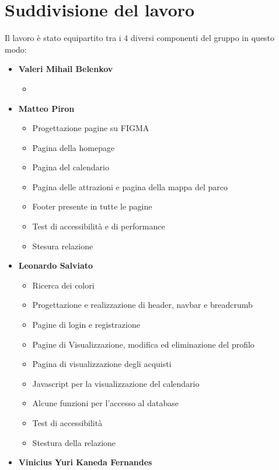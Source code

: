 \section{Suddivisione del lavoro}
Il lavoro è stato equipartito tra i 4 diversi componenti del gruppo in questo modo:

\begin{itemize}
    \item \textbf{Valeri Mihail Belenkov}
        \begin{itemize}
            \item 
        \end{itemize}
    \item \textbf{Matteo Piron}
        \begin{itemize}
            \item Progettazione pagine su FIGMA
            \item Pagina della homepage
            \item Pagina del calendario
            \item Pagina delle attrazioni e pagina della mappa del parco
            \item Footer presente in tutte le pagine
            \item Test di accessibilità e di performance
            \item Stesura relazione
        \end{itemize}
    \item \textbf{Leonardo Salviato}
        \begin{itemize}
            \item Ricerca dei colori
            \item Progettazione e realizzazione di header, navbar e breadcrumb
            \item Pagine di login e registrazione
            \item Pagine di Visualizzazione, modifica ed eliminazione del profilo
            \item Pagina di visualizzazione degli acquisti
            \item Javascript per la visualizzazione del calendario
            \item Alcune funzioni per l'accesso al database
            \item Test di accessibilità
            \item Stestura della relazione
        \end{itemize}
    \item \textbf{Vinicius Yuri Kaneda Fernandes}

\end{itemize}
